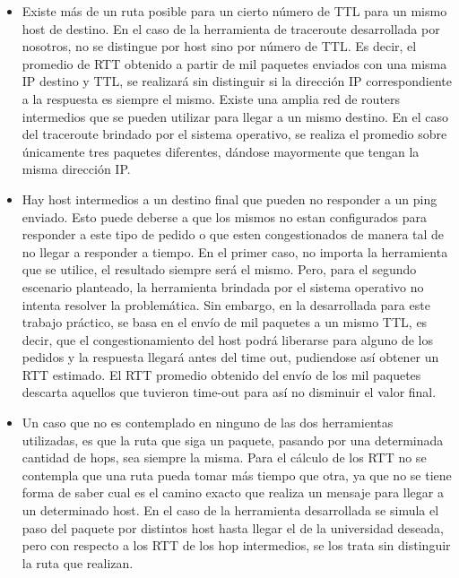 \begin{itemize}
\item Existe más de un ruta posible para un cierto número de TTL para un mismo host de destino. En el caso de la herramienta de traceroute desarrollada por nosotros, no se distingue por host sino por número de TTL. Es decir, el promedio de RTT obtenido a partir de mil paquetes enviados con una misma IP destino y TTL, se realizará sin distinguir si la dirección IP correspondiente a la respuesta es siempre el mismo. Existe una amplia red de routers intermedios que se pueden utilizar para llegar a un mismo destino. En el caso del traceroute brindado por el sistema operativo, se realiza el promedio sobre únicamente tres paquetes diferentes, dándose mayormente que tengan la misma dirección IP. 

\item Hay host intermedios a un destino final que pueden no responder a un ping enviado. Esto puede deberse a que los mismos no estan configurados para responder a este tipo de pedido o que esten congestionados de manera tal de no llegar a responder a tiempo. En el primer caso, no importa la herramienta que se utilice, el resultado siempre será el mismo. Pero, para el segundo escenario planteado, la herramienta brindada por el sistema operativo no intenta resolver la problemática. Sin embargo, en la desarrollada para este trabajo práctico, se basa en el envío de mil paquetes a un mismo TTL, es decir, que el congestionamiento del host podrá liberarse para alguno de los pedidos y la respuesta llegará antes del time out, pudiendose así obtener un RTT estimado. El RTT promedio obtenido del envío de los mil paquetes descarta aquellos que tuvieron time-out para así no disminuir el valor final.

\item Un caso que no es contemplado en ninguno de las dos herramientas utilizadas, es que la ruta que siga un paquete, pasando por una determinada cantidad de hops, sea siempre la misma. Para el cálculo de los RTT no se contempla que una ruta pueda tomar más tiempo que otra, ya que no se tiene forma de saber cual es el camino exacto que realiza un mensaje para llegar a un determinado host. En el caso de la herramienta desarrollada se simula el paso del paquete por distintos host hasta llegar el de la universidad deseada, pero con respecto a los RTT de los hop intermedios, se los trata sin distinguir la ruta que realizan. 


\end{itemize}



